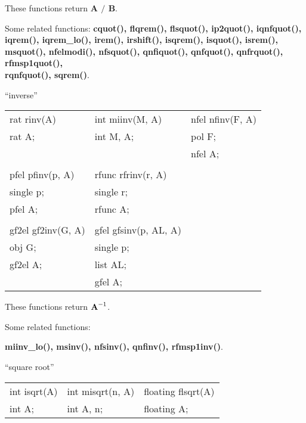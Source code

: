 These functions return {\bf A $/$ B}.

Some related functions:\hspace*{0.7em}
{\bf cquot(), flqrem(), flsquot(), ip2quot(), iqnfquot(), \\
iqrem(), iqrem\_lo(), irem(),
irshift(), isqrem(), isquot(), isrem(), msquot(), nfelmodi(), nfsquot(), qnfiquot(), 
qnfquot(), qnfrquot(), rfmsp1quot(), \\
rqnfquot(), sqrem()}.

\newpage

\leer
\begin{center} ``inverse'' \end{center}
\begin{center}
{\bf
\begin{tabular}{lll}
rat rinv(A) & int miinv(M, A) & nfel nfinv(F, A)\\
rat A;      & int M, A;       & pol F;\\
            &                 & nfel A;\\
&&\\
pfel pfinv(p, A) & rfunc rfrinv(r, A) &\\
single p;        & single r;          &\\
pfel A;          & rfunc A;           &\\
&&\\
gf2el gf2inv(G, A) & gfel gfsinv(p, AL, A) &\\
obj G;             & single p;             &\\
gf2el A;           & list AL;              &\\
                   & gfel A;               &\\[1.5ex]
\end{tabular} }
\end{center}

These functions return $\mbox{\bf A}^{-1}$.

Some related functions:\hspace*{0.7em}

{\bf miinv\_lo(), msinv(), nfsinv(), qnfinv(), rfmsp1inv()}.

\begin{center} ``square root'' \end{center}
\begin{center}
{\bf
\begin{tabular}{lll}
int isqrt(A) & int misqrt(n, A) & floating flsqrt(A)\\
int A;       & int A, n;        & floating A;\\[1.5ex]
\end{tabular} }
\end{center}

